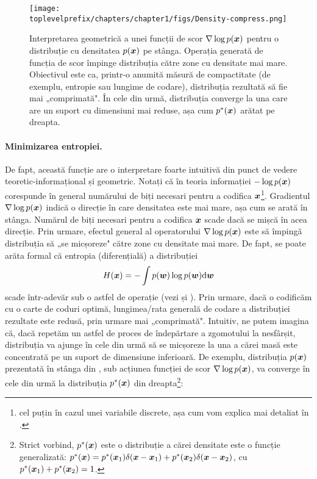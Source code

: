 \documentclass[../../book-main_ro.tex]{subfiles}
\begin{document}
\begin{figure}
    \centering
    \texttt{[image: \\toplevelprefix/chapters/chapter1/figs/Density-compress.png]}
    \caption{Interpretarea geometrică a unei funcții de scor $\nabla \log p(\bm{x})$ pentru o distribuție cu densitatea $p(\bm{x})$ pe stânga. Operația generată de funcția de scor împinge distribuția către zone cu densitate mai mare. Obiectivul este ca, printr-o anumită măsură de compactitate (de exemplu, entropie sau lungime de codare), distribuția rezultată să fie mai „comprimată". În cele din urmă, distribuția converge la una care are un suport cu dimensiuni mai reduse, așa cum $p^*(\bm{x})$ arătat pe dreapta.}
    \label{fig:score-function}
\end{figure}

\paragraph{Minimizarea entropiei.} De fapt, această funcție are o interpretare foarte intuitivă din punct de vedere teoretic-informațional și geometric. Notați că în teoria informației $-\log p(\bm{x})$ corespunde în general numărului de biți necesari pentru a codifica $\bm{x}$\footnote{cel puțin în cazul unei variabile discrete, așa cum vom explica mai detaliat în .}. Gradientul $\nabla \log p(\bm{x})$ indică o direcție în care densitatea este mai mare, așa cum se arată în  stânga. Numărul de biți necesari pentru a codifica $\bm{x}$ scade dacă se mișcă în acea direcție. Prin urmare, efectul general al operatorului $\nabla \log p(\bm{x})$ este să împingă distribuția să „se micșoreze" către zone cu densitate mai mare. De fapt, se poate arăta formal că entropia (diferențială) a distribuției
\begin{equation}
H(\bm{x}) = - \int p(\boldsymbol{w}) \log p(\boldsymbol{w}) \mathrm{d}\boldsymbol{w}    \end{equation}
scade într-adevăr sub o astfel de operație (vezi  și ). Prin urmare, dacă o codificăm cu o carte de coduri optimă, lungimea/rata generală de codare a distribuției rezultate este redusă, prin urmare mai „comprimată". Intuitiv, ne putem imagina că, dacă repetăm un astfel de proces de îndepărtare a zgomotului la nesfârșit, distribuția va ajunge în cele din urmă să se micșoreze la una a cărei masă este concentrată pe un suport de dimensiune inferioară. De exemplu, distribuția $p(\bm{x})$ prezentată în stânga din , sub acțiunea funcției de scor $\nabla \log p(\bm{x})$, va converge în cele din urmă la distribuția $p^*(\bm{x})$ din dreapta\footnote{Strict vorbind, $p^*(\bm{x})$ este o distribuție a cărei densitate este o funcție generalizată: $p^*(\bm{x}) = p^*(\bm{x}_1)\delta(\bm{x}-\bm{x}_1) + p^*(\bm{x}_2) \delta(\bm{x}-\bm{x}_2)$, cu $p^*(\bm{x}_1) + p^*(\bm{x}_2) = 1$.}:
\end{document}
